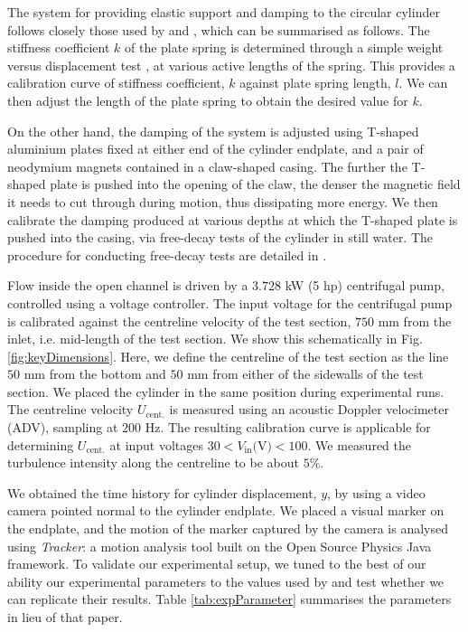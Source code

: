 \documentclass[a4paper,fleqn]{cas-sc}
\begin{document}
The system for providing elastic support and damping to the circular cylinder follows closely those used by \citet{Kawabata2013} and \citet{Koide2013,Koide2017}, which can be summarised as follows. The stiffness coefficient $k$ of the plate spring is determined through a simple weight versus displacement test \citep{Sun2016}, at various active lengths of the spring. This provides a calibration curve of stiffness coefficient, $k$ against plate spring length, $l$. We can then adjust the length of the plate spring to obtain the desired value for $k$.

On the other hand, the damping of the system is adjusted using T-shaped aluminium plates fixed at either end of the cylinder endplate, and a pair of neodymium magnets contained in a claw-shaped casing. The further the T-shaped plate is pushed into the opening of the claw, the denser the magnetic field it needs to cut through during motion, thus dissipating more energy. We then calibrate the damping produced at various depths at which the T-shaped plate is pushed into the casing, via free-decay tests of the cylinder in still water. The procedure for conducting free-decay tests are detailed in \citet{Raghavan2007}.

Flow inside the open channel is driven by a $3.728$ kW (5 hp) centrifugal pump, controlled using a voltage controller. The input voltage for the centrifugal pump is calibrated against the centreline velocity of the test section, $750$ mm from the inlet, i.e. mid-length of the test section. We show this schematically in Fig. \ref{fig:keyDimensions}. Here, we define the centreline of the test section as the line $50$ mm from the bottom and $50$ mm from either of the sidewalls of the test section. We placed the cylinder in the same position during experimental runs. The centreline velocity $U_{\text{cent.}}$ is measured using an acoustic Doppler velocimeter (ADV), sampling at $200$ Hz. The resulting calibration curve is applicable for determining $U_{\text{cent.}}$ at input voltages $30 < V_{\text{in}} \text{(V)} < 100$. We measured the turbulence intensity along the centreline to be about $5\%$.

We obtained the time history for cylinder displacement, $y$, by using a video camera pointed normal to the cylinder endplate. We placed a visual marker on the endplate, and the motion of the marker captured by the camera is analysed using \textit{Tracker}: a motion analysis tool built on the Open Source Physics Java framework. To validate our experimental setup, we tuned to the best of our ability our experimental parameters to the values used by \citet{Koide2013} and test whether we can replicate their results. Table \ref{tab:expParameter} summarises the parameters in lieu of that paper.
\end{document}
